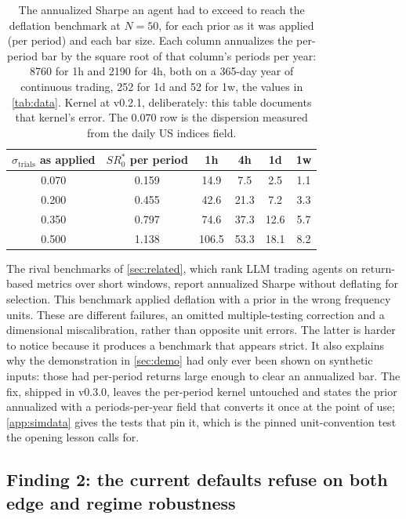 \begin{table}[t]
\centering
\small
\caption{The annualized Sharpe an agent had to exceed to reach the deflation benchmark at $N = 50$, for each prior as it was applied (per period) and each bar size. Each column annualizes the per-period bar by the square root of that column's periods per year: 8760 for 1h and 2190 for 4h, both on a 365-day year of continuous trading, 252 for 1d and 52 for 1w, the values in \cref{tab:data}. Kernel at v0.2.1, deliberately: this table documents that kernel's error. The $0.070$ row is the dispersion measured from the daily US indices field.}
\label{tab:units}
\setlength{\tabcolsep}{9pt}
\begin{tabular}{S[table-format=1.3] S[table-format=1.3] S[table-format=3.1] S[table-format=2.1] S[table-format=2.1] S[table-format=1.1]}
\toprule
{$\sigma_{\text{trials}}$ as applied} & {$SR^{*}_{0}$ per period} & {1h} & {4h} & {1d} & {1w} \\
 & 0.159 & 14.9 & 7.5 & 2.5 & 1.1 \\
0.200 & 0.455 & 42.6 & 21.3 & 7.2 & 3.3 \\
0.350 & 0.797 & 74.6 & 37.3 & 12.6 & 5.7 \\
0.500 & 1.138 & 106.5 & 53.3 & 18.1 & 8.2 \\
\bottomrule
\end{tabular}
\end{table}

The rival benchmarks of \cref{sec:related}, which rank LLM trading agents on return-based metrics over short windows, report annualized Sharpe without deflating for selection. This benchmark applied deflation with a prior in the wrong frequency units. These are different failures, an omitted multiple-testing correction and a dimensional miscalibration, rather than opposite unit errors. The latter is harder to notice because it produces a benchmark that appears strict. It also explains why the demonstration in \cref{sec:demo} had only ever been shown on synthetic inputs: those had per-period returns large enough to clear an annualized bar. The fix, shipped in v0.3.0, leaves the per-period kernel untouched and states the prior annualized with a periods-per-year field that converts it once at the point of use; \cref{app:simdata} gives the tests that pin it, which is the pinned unit-convention test the opening lesson calls for.

\subsection{Finding 2: the current defaults refuse on both edge and regime robustness}\label{sec:passk}

